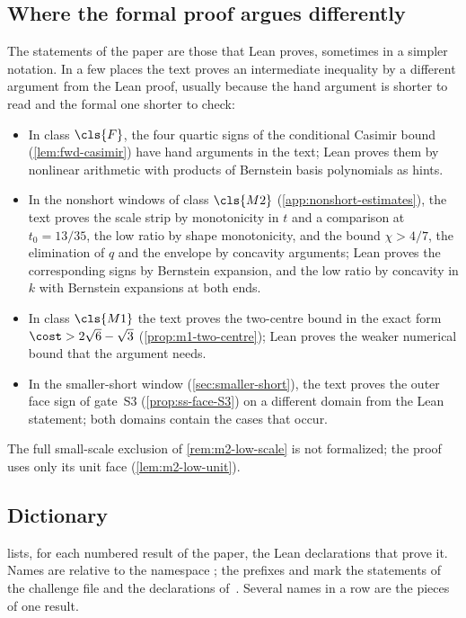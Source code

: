 \subsection{Where the formal proof argues differently}\label{app:formal-routes}

The statements of the paper are those that Lean proves, sometimes in a simpler notation. In a few
places the text proves an intermediate inequality by a different argument from the Lean proof,
usually because the hand argument is shorter to read and the formal one shorter to check:
\begin{itemize}
\item In class $\cls{F}$, the four quartic signs of the conditional Casimir bound
  (\cref{lem:fwd-casimir}) have hand arguments in the text; Lean proves them by nonlinear
  arithmetic with products of Bernstein basis polynomials as hints.
\item In the nonshort windows of class $\cls{M2}$ (\cref{app:nonshort-estimates}), the text proves
  the scale strip by monotonicity in $t$ and a comparison at $t_0=13/35$, the low ratio by shape
  monotonicity, and the bound $\chi>4/7$, the elimination of $q$ and the envelope by concavity
  arguments; Lean proves the corresponding signs by Bernstein expansion, and the low ratio by
  concavity in $k$ with Bernstein expansions at both ends.
\item In class $\cls{M1}$ the text proves the two-centre bound in the exact form
  $\cost>2\sqrt6-\sqrt3$ (\cref{prop:m1-two-centre}); Lean proves the weaker numerical bound that
  the argument needs.
\item In the smaller-short window (\cref{sec:smaller-short}), the text proves the outer face sign
  of gate~S3 (\cref{prop:ss-face-S3}) on a different domain from the Lean statement; both domains
  contain the cases that occur.
\end{itemize}
The full small-scale exclusion of \cref{rem:m2-low-scale} is not formalized; the proof uses only
its unit face (\cref{lem:m2-low-unit}).

\subsection{Dictionary}\label{app:formal-dictionary}

 lists, for each numbered result of the paper, the Lean declarations
that prove it. Names are relative to the namespace ; the prefixes
 and  mark the statements of the challenge file and
the declarations of~\cite{SmoothedPolygonLean}. Several names in a row are the pieces of one
result.

